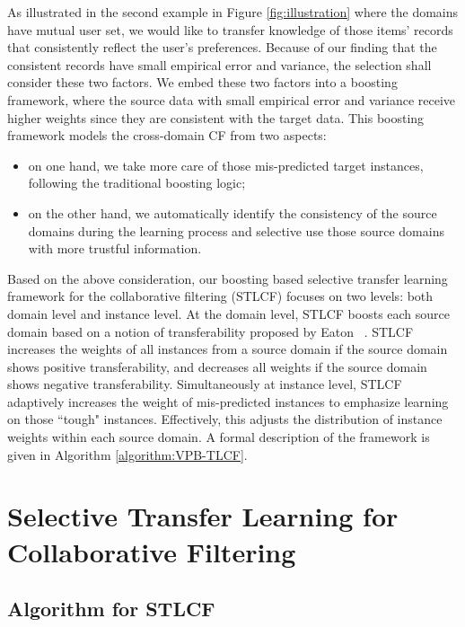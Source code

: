 As illustrated in the second example in Figure \ref{fig:illustration} where the domains have mutual user set, we would like to transfer knowledge of those items' records that consistently reflect the user's preferences. Because of our finding that the consistent records have small empirical error and variance, the selection shall consider these two factors.
We embed these two factors into a boosting framework, where the source data with small empirical error and variance receive higher weights since they are consistent with the target data.
This boosting framework models the cross-domain CF from two aspects:
\begin{itemize}
\item on one hand, we take more care of those mis-predicted target instances, following the traditional boosting logic;
\item on the other hand, we automatically identify the consistency of the source domains during the learning process and selective use those source domains with more trustful information.
\end{itemize}

Based on the above consideration, our boosting based selective transfer learning framework for the collaborative filtering (STLCF) focuses on two levels: both domain level and instance level.
At the domain level, STLCF boosts each source domain based on a notion of transferability proposed by Eaton \etal~\cite{/ecml/Eaton2008Modeling}. STLCF increases the weights of all instances from a source domain if the source domain shows positive transferability, and decreases all weights if the source domain shows negative transferability. Simultaneously at instance level, STLCF adaptively increases the weight of mis-predicted instances to emphasize learning on those ``tough" instances. Effectively, this adjusts the distribution of instance weights within each source domain. A formal description of the framework is given in Algorithm \ref{algorithm:VPB-TLCF}.

\hspace{0.1in}
\section{Selective Transfer Learning for Collaborative Filtering}
\subsection{Algorithm for STLCF}

